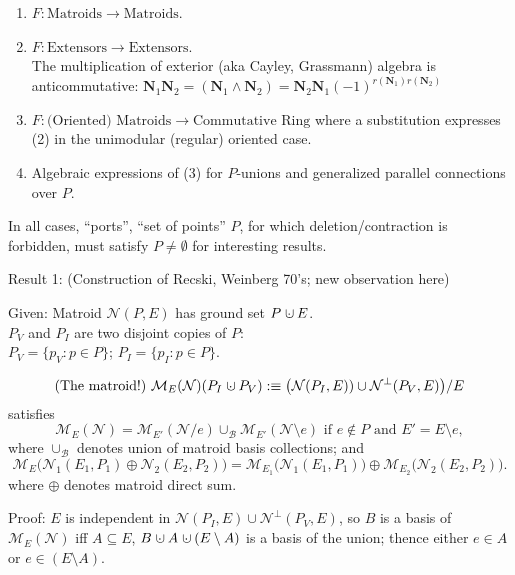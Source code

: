 \documentclass[%
  slidesonly,%
  semlayer,%
  amsmath
  ]{seminar}                                  %
\newcommand{\dunion}
{\mbox{\hbox{\hskip0.45em$\cdot$\hskip-0.44em$\cup$\hskip0.2em}}}
\begin{document}
\begin{slide}
\begin{enumerate}
\item $F:\mbox{Matroids}\rightarrow\mbox{Matroids}$.
\item $F:\mbox{Extensors}\rightarrow\mbox{Extensors}$.\\
The multiplication of exterior (aka Cayley, Grassmann) algebra
is anticommutative: $\mathbf{N}_1\mathbf{N}_2=(\mathbf{N}_1\wedge\mathbf{N}_2)=
\mathbf{N}_2\mathbf{N}_1(-1)^{r(\mathbf{N}_1)r(\mathbf{N}_2)}$
\item $F:\mbox{(Oriented) Matroids}\rightarrow\mbox{Commutative Ring}$ where 
a substitution expresses (2) in the unimodular (regular) oriented case.
\item Algebraic expressions of (3) for $P$-unions and generalized parallel
connections over $P$.
\end{enumerate}
\vspace{1em}
In all cases, ``ports'', ``set of points'' $P$, for which deletion/contraction is
forbidden, must satisfy $P\neq\emptyset$ for interesting results.

\end{slide}

\begin{slide}
Result 1: (Construction of Recski, Weinberg 70's; new observation here)
\begin{center}
Given: Matroid $\mathcal{N}(P,E)$ has ground set $P\dunion E$.\\
$P_V$ and $P_I$ are two disjoint copies of $P$:\\
$P_V=\{p_V: p\in P\}$; $P_I=\{p_I: p\in P\}$.
\end{center}
\[
\text{(The matroid!)\ }\mathcal{M}_E(\mathcal{N})(P_I\dunion P_V)
:\equiv \big(\mathcal{N}(P_I,E))\cup\mathcal{N}^{\perp}(P_V,E)\big)/E
\]
satisfies
\[
\mathcal{M}_E(\mathcal{N}) = \mathcal{M}_{E'}(\mathcal{N}/ e) \cup_{\mathcal{B}}
\mathcal{M}_{E'}(\mathcal{N}\setminus e)\text{ if }e\not\in P\text{ and }E'=E\setminus e,
\]
where $\cup_{\mathcal{B}}$ denotes union of matroid basis collections; and
\[
\mathcal{M}_{E}\big(\mathcal{N}_1(E_1,P_1)\oplus\mathcal{N}_2(E_2,P_2)\big)=
\mathcal{M}_{E_1}\big(\mathcal{N}_1(E_1,P_1)\big)\oplus
\mathcal{M}_{E_2}\big(\mathcal{N}_2(E_2,P_2)\big).
\]
where $\oplus$ denotes matroid direct sum.

Proof:  $E$ is independent in $\mathcal{N}(P_I,E)\cup\mathcal{N}^{\perp}(P_V,E)$, so
$B$ is a basis of $\mathcal{M}_E(\mathcal{N})$ iff $A\subseteq E$, 
$B\dunion A \dunion (E\setminus A)$ is a basis of the union; thence either $e\in A$ or $e\in (E\setminus A)$.
\end{slide}
\end{document}
